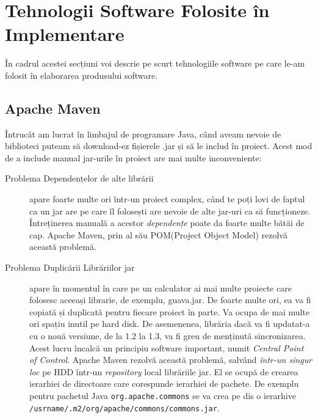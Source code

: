 
\section{Tehnologii Software Folosite în Implementare}

În cadrul acestei secțiuni voi descrie pe scurt tehnologiile software pe care le-am folosit în elaborarea produsului software.

\subsection{Apache Maven}


Întrucât am lucrat în limbajul de programare Java, când aveam nevoie de biblioteci puteam să download-ez fișierele .jar și să le includ în proiect. Acest mod de a include manual jar-urile în proiect are mai multe inconveniente:


\begin{description}
\item[Problema Dependențelor de alte librării] apare foarte multe ori într-un proiect complex, când te poți lovi de faptul ca un jar are pe care îl folosești are nevoie de alte jar-uri ca să funcționeze. Întreținerea manuală a acestor \textit{dependențe} poate da foarte multe bătăi de cap. Apache Maven, prin al său POM(Project Object Model) rezolvă această problemă.

\item[Problema Duplicării Librăriilor jar] apare în momentul în care pe un calculator ai mai multe proiecte care folosesc aceeași librarie, de exemplu, guava.jar. De foarte multe ori, ea va fi copiată și duplicată pentru fiecare proiect în parte. Va ocupa de mai multe ori spațiu inutil pe hard disk. De asemenenea, librăria dacă va fi updatat-a cu o nouă versiune, de la 1.2 la 1.3, va fi greu de menținută sincronizarea. Acest lucru încalcă un principiu software important, numit \textit{Central Point of Control}. Apache Maven rezolvă această problemă, salvând \textit{într-un singur loc} pe HDD într-un \textit{repository} local librăriile jar. El se ocupă de crearea ierarhiei de directoare care corespunde ierarhiei de pachete. De exemplu pentru pachetul Java \texttt{org.apache.commons} se va crea pe dis o ierarhive \texttt{/usrname/.m2/org/apache/commons/commons.jar}.
\end{description}

